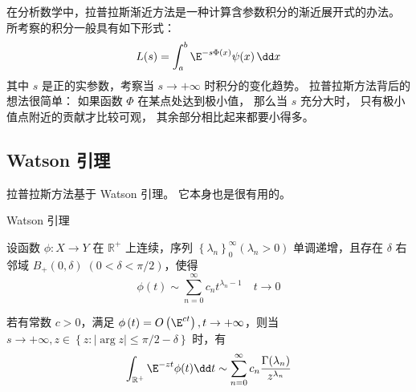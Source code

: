 

在分析数学中，拉普拉斯渐近方法是一种计算含参数积分的渐近展开式的办法。 所考察的积分一般具有如下形式：
\begin{equation}\label{LapAsm_eq1}
L(s)=\int_a^b\E^{-s\Phi(x)}\psi(x)\,\dd x
\end{equation}
其中 $s$ 是正的实参数，考察当 $s\to+\infty$ 时积分的变化趋势。 拉普拉斯方法背后的想法很简单： 如果函数 $\Phi$ 在某点处达到极小值， 那么当 $s$ 充分大时， 只有极小值点附近的贡献才比较可观， 其余部分相比起来都要小得多。

\subsection{Watson 引理}
拉普拉斯方法基于 Watson 引理。 它本身也是很有用的。

\begin{lemma}{Watson 引理}

设函数 $\phi:X\to Y$ 在 $\mathbb{R}^+$ 上连续，序列 $\left\{\lambda_n\right\}_0^\infty\left(\lambda_n>0\right)$ 单调递增，且存在 $\delta$ 右邻域 $B_{+}(0,\delta)\;(0<\delta<\pi/2)$，使得
\begin{equation}\label{LapAsm_eq2}
  \phi\left(t\right)\sim\sum_{n=0}^{\infty}{c_nt^{\lambda_n-1}}\quad t\to0
\end{equation}

若有常数 $c>0$，满足 $\phi\left(t\right)=O\left(\E^{ct}\right),t\to+\infty$，则当 $s\to+\infty,z\in{\left\{z:\left|\arg{z}\right|\le\pi/2-\delta\right\}}$ 时，有
\begin{equation}\label{LapAsm_eq3}
\int_{\mathbb{R}^+}\E^{-zt}\phi(t)\dd t\sim\sum_{n=0}^{\infty}{c_n}\frac{\Gamma(\lambda_n)}{z^{\lambda_n}}  
\end{equation}
\end{lemma}

